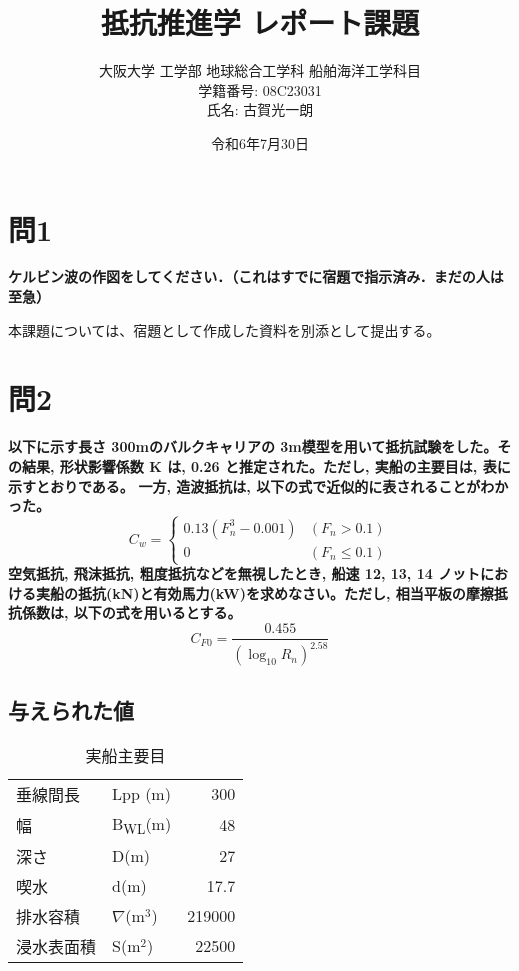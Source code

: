 \documentclass[12pt, a4paper, leqno, dvipdfmx]{jarticle}
\title{抵抗推進学 レポート課題}
\author{大阪大学 工学部 地球総合工学科 船舶海洋工学科目 \\ 学籍番号: 08C23031 \\ 氏名: 古賀光一朗}
\date{令和6年7月30日}
\begin{document}
\maketitle

\section*{問1}
\textbf{ケルビン波の作図をしてください．（これはすでに宿題で指示済み．まだの人は至急）}

\vspace{5mm}
本課題については、宿題として作成した資料を別添として提出する。

\newpage

\section*{問2}
\textbf{以下に示す長さ 300mのバルクキャリアの 3m模型を用いて抵抗試験をした。その結果, 形状影響係数 K は, 0.26 と推定された。ただし, 実船の主要目は, 表に示すとおりである。}
\textbf{一方, 造波抵抗は, 以下の式で近似的に表されることがわかった。}
$$
C_w = 
\begin{cases}
    0.13(F_n^3 - 0.001) & (F_n > 0.1) \\
    0 & (F_n \le 0.1)
\end{cases}
$$
\textbf{空気抵抗, 飛沫抵抗, 粗度抵抗などを無視したとき, 船速 12, 13, 14 ノットにおける実船の抵抗(kN)と有効馬力(kW)を求めなさい。ただし, 相当平板の摩擦抵抗係数は, 以下の式を用いるとする。}
$$
C_{F0} = \frac{0.455}{(\log_{10} R_n)^{2.58}}
$$

\vspace{5mm}
\subsection*{与えられた値}
\begin{table}[H]
    \centering
    \caption{実船主要目}
    \begin{tabular}{llr}
        \toprule
        垂線間長 & Lpp (m) & 300 \\
        幅 & B\textsubscript{WL}(m) & 48 \\
        深さ & D(m) & 27 \\
        喫水 & d(m) & 17.7 \\
        排水容積 & $\nabla$(m$^3$) & 219000 \\
        浸水表面積 & S(m$^2$) & 22500 \\
        \bottomrule
    \end{tabular}
\end{table}
\end{document}
